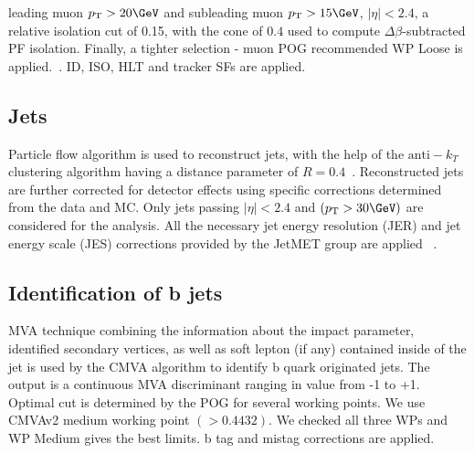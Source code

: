         
        
        
        
        
        
        
        
        
        
        
        
        
        
leading muon $\pt>20\GeV$ and subleading muon $\pt>15\GeV$, $|\eta|<2.4$,
a relative
isolation cut of 0.15, with the cone of $0.4$ used to compute $\Delta\beta$-subtracted PF isolation.
Finally, a tighter selection - muon POG recommended WP Loose is applied.~\cite{MuonsRun2}. ID, ISO, HLT and tracker SFs are applied.

\subsection{Jets\label{sec:jets}}
    Particle flow algorithm is used to reconstruct jets\cite{CMS-PAS-PFT-09-001,CMS-PAS-PFT-10-001}, with the help of the  $\text{anti}-k_T$ clustering algorithm having a distance parameter of $R=0.4$~\cite{Cacciari:2005hq,Cacciari:2008gp}.
    Reconstructed jets are further corrected for detector effects using specific corrections determined from the data and MC. Only jets passing $|\eta|<2.4$ and  $(\pt > 30\GeV)$ are considered for the analysis. 
    All the necessary jet energy resolution (JER) and jet energy scale (JES) corrections provided by the JetMET group are applied ~\cite{JetMETgroup}.


\subsection{Identification of b jets\label{sec:bjets}}
MVA technique combining the information about the impact parameter, identified secondary vertices, as well as soft lepton (if any) contained inside of the jet is used by the CMVA algorithm to identify b quark originated jets. The output is a continuous MVA discriminant ranging in value from -1 to +1. Optimal cut is determined by the POG for several working points. We use CMVAv2 medium working point  $(>0.4432)$. We checked all three WPs and WP Medium gives the best limits. b tag and mistag corrections are applied.

